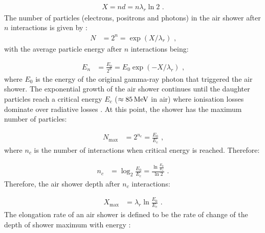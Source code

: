 \begin{equation}
    \begin{aligned}
    X=nd=n\lambda_r\ln 2\text{ .}
    \end{aligned} \label{eq:chapter_2_gas_depth}
\end{equation}
\noindent The number of particles (electrons, positrons and photons) in the air shower after $n$ interactions is given by \citep{MATTHEWS2005387}:
\begin{equation}
    \begin{aligned}
    N&=2^n=\exp(X/\lambda_r)\text{ ,}
    \end{aligned}
\end{equation}
\noindent with the average particle energy after $n$ interactions being:

\begin{equation}
    \begin{aligned}
    E_n&=\frac{E_0}{2^n}=E_0\exp(-X/\lambda_r)\text{ ,}
    \end{aligned}
\end{equation}
\noindent where $E_0$ is the energy of the original gamma-ray photon that triggered the air shower.
\newpar 
The exponential growth of the air shower continues until the daughter particles reach a critical energy $E_c$ ($\approx 85\,\si{\mega\electronvolt}$ in air) where ionisation losses dominate over radiative losses \citep{1954qtr..book.....H}. At this point, the shower has the maximum number of particles:

\begin{equation}
    \begin{aligned}
    N_\text{max}&=2^{n_c} = \frac{E_0}{E_c}\text{ ,}
    \end{aligned} \label{eq:chapter_1_gas_max_particles} 
\end{equation}
\noindent where $n_c$ is the number of interactions when critical energy is reached. Therefore:

\begin{equation}
    \begin{aligned}
    n_c&=\log_2 \frac{E_0}{E_c} =\frac{\ln{\frac{E_0}{E_c}}}{\ln 2}\text{ .}
    \end{aligned} \label{eq:chapter_2_gas_max_interactions}
\end{equation}
\noindent Therefore, the air shower depth after $n_c$ interactions:

\begin{equation}
    \begin{aligned}
    X_\text{max}&=\lambda_r \ln\frac{E_0}{E_c}\text{ .}
    \end{aligned} \label{eq:chapter_2_gas_max_depth}
\end{equation}
\noindent The elongation rate of an air shower is defined to be the rate of change of the depth of shower maximum with energy \citep{MATTHEWS2005387}:

